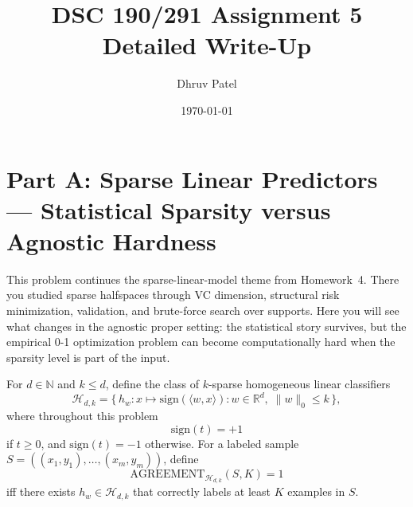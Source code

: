 \documentclass[11pt]{article}
\title{\textbf{DSC 190/291 Assignment 5}\\Detailed Write-Up}
\author{Dhruv Patel}
\date{\today}
\newcommand{\sign}{\mathrm{sign}}
\begin{document}
\maketitle
\tableofcontents
\newpage

\section{Part A: Sparse Linear Predictors --- Statistical Sparsity versus Agnostic Hardness}

This problem continues the sparse-linear-model theme from Homework~4. There you studied
sparse halfspaces through VC dimension, structural risk minimization, validation, and
brute-force search over supports. Here you will see what changes in the agnostic proper setting: the statistical story survives, but the empirical 0-1 optimization problem can become computationally hard when the sparsity level is part of the input.

For $d \in \mathbb{N}$ and $k \le d$, define the class of $k$-sparse homogeneous linear classifiers
\[
\mathcal{H}_{d,k}
  = \bigl\{\, h_w : x \mapsto \sign(\langle w, x\rangle)
    : w \in \mathbb{R}^d,\; \|w\|_0 \le k \,\bigr\},
\]
where throughout this problem
\[
\sign(t)=+1
\]
if $t\ge 0$, and $\sign(t)=-1$ otherwise.
\newline
For a labeled sample $S=((x_1,y_1),\ldots,(x_m,y_m))$, define
\[
\mathrm{AGREEMENT}_{\mathcal{H}_{d,k}}(S,K)=1
\]
iff there exists $h_w\in\mathcal{H}_{d,k}$ that correctly labels at least $K$ examples in $S$.
\end{document}
